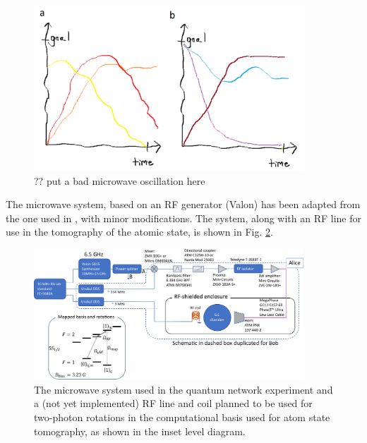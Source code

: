 
\begin{figure}[!ht]
    \centering
    \includegraphics[width=0.9\textwidth]{Images/fig_coming_soon.png}
    \caption{?? put a bad microwave oscillation here}
    \label{fig:microwave_oscillation}
\end{figure}

The microwave system, based on an RF generator (Valon) has been adapted from the one used in \cite{Young2022thesis,kwon2019rydberg}, with minor modifications. The system, along with an RF line for use in the tomography of the atomic state, is shown in Fig. \ref{fig:microwave_system}.

\begin{figure}[!ht]
    \centering
    \includegraphics[width=0.9\textwidth]{Images/microwave_system_schematic.pdf}
    \caption{The microwave system used in the quantum network experiment and a (not yet implemented) RF line and coil planned to be used for two-photon rotations in the computational basis used for atom state tomography, as shown in the inset level diagram.}
    \label{fig:microwave_system}
\end{figure}
